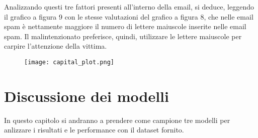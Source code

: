 \documentclass[12pt,a4paper]{article}
\begin{document}
Analizzando questi tre fattori presenti all'interno della email, si deduce, leggendo il grafico a figura 9 con le stesse valutazioni del grafico a figura 8, che nelle email spam è nettamente maggiore il numero di lettere maiuscole inserite nelle email spam.
Il malintenzionato preferisce, quindi, utilizzare le lettere maiuscole per carpire l'attenzione della vittima.

\begin{figure}[h]
    \centering
    \texttt{[image: capital\_plot.png]}
    \caption{}
\end{figure}
\section{Discussione dei modelli}
In questo capitolo si andranno a prendere come campione tre modelli per anlizzare i risultati e le performance con il dataset fornito.
\end{document}
